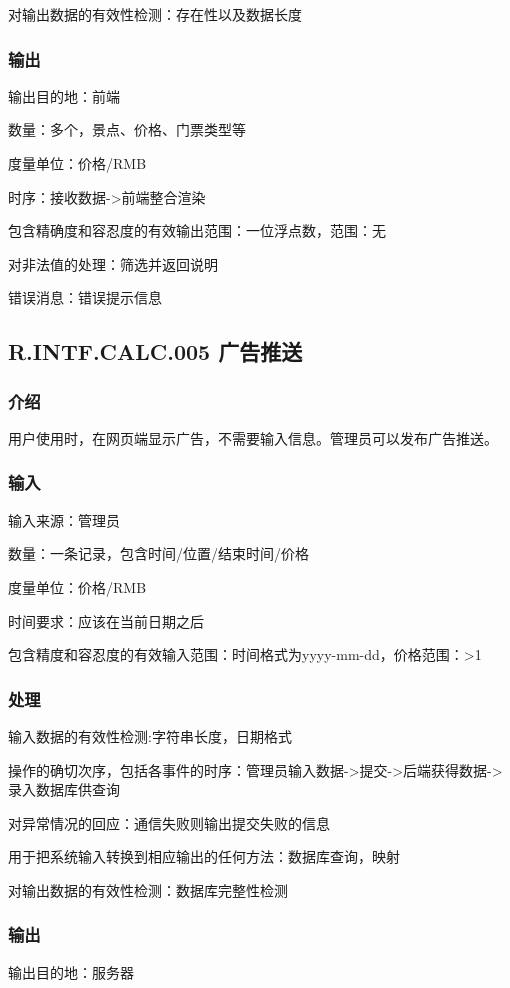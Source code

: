 	对输出数据的有效性检测：存在性以及数据长度
\subsubsection{输出}
		输出目的地：前端

		数量：多个，景点、价格、门票类型等

		度量单位：价格/RMB

		时序：接收数据->前端整合渲染

		包含精确度和容忍度的有效输出范围：一位浮点数，范围：无

		对非法值的处理：筛选并返回说明

		错误消息：错误提示信息



\subsection{R.INTF.CALC.005 广告推送}
\subsubsection{介绍}
用户使用时，在网页端显示广告，不需要输入信息。管理员可以发布广告推送。
\subsubsection{输入}
		输入来源：管理员

		数量：一条记录，包含时间/位置/结束时间/价格

		度量单位：价格/RMB

		时间要求：应该在当前日期之后

		包含精度和容忍度的有效输入范围：时间格式为yyyy-mm-dd，价格范围：>1
\subsubsection{处理}
	输入数据的有效性检测:字符串长度，日期格式

	操作的确切次序，包括各事件的时序：管理员输入数据->提交->后端获得数据->录入数据库供查询

	对异常情况的回应：通信失败则输出提交失败的信息

	用于把系统输入转换到相应输出的任何方法：数据库查询，映射

	对输出数据的有效性检测：数据库完整性检测
\subsubsection{输出}
		输出目的地：服务器

